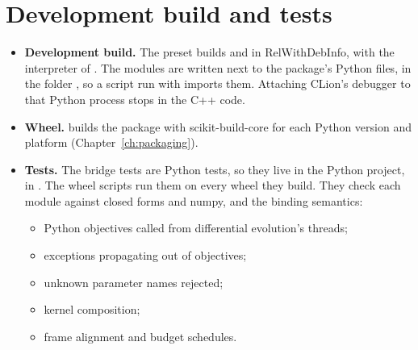 \section{Development build and tests}
\begin{itemize}
  \item \textbf{Development build.} The preset  builds  and
         in RelWithDebInfo, with the interpreter of .
        The modules are written next to the package's Python files, in the folder
        , so a script run with
         imports them. Attaching CLion's debugger to that Python
        process stops in the C++ code.
  \item \textbf{Wheel.}  builds the package with scikit-build-core for each
        Python version and platform (Chapter~\ref{ch:packaging}).
  \item \textbf{Tests.} The bridge tests are Python tests, so they live in the Python project,
        in . The wheel scripts run them on every wheel they build.
        They check each module against closed forms and numpy, and the binding semantics:
        \begin{itemize}
          \item Python objectives called from differential evolution's threads;
          \item exceptions propagating out of objectives;
          \item unknown parameter names rejected;
          \item kernel composition;
          \item frame alignment and budget schedules.
        \end{itemize}
\end{itemize}
